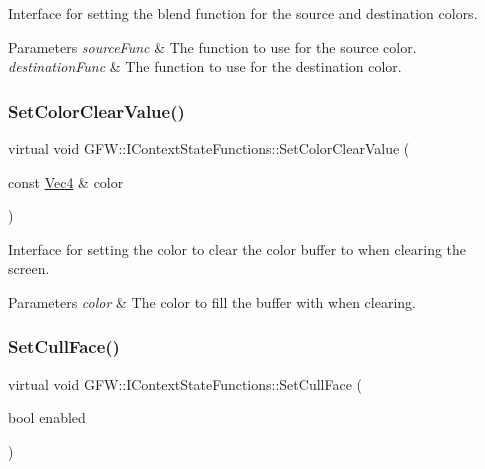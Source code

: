 Interface for setting the blend function for the source and destination colors. 


\begin{DoxyParams}{Parameters}
{\em source\+Func} & The function to use for the source color. \\
\hline
{\em destination\+Func} & The function to use for the destination color. \\
\hline
\end{DoxyParams}
\mbox{\label{class_g_f_w_1_1_i_context_state_functions_aa18c9eb29a5e2c85440e28e72db56b05}} 
\subsubsection{\texorpdfstring{Set\+Color\+Clear\+Value()}{SetColorClearValue()}}
{\footnotesize\ttfamily virtual void G\+F\+W\+::\+I\+Context\+State\+Functions\+::\+Set\+Color\+Clear\+Value (\begin{DoxyParamCaption}\item[{const \hyperlink{namespace_g_f_w_1_1_math_a22b76a9624ba36b0f4eaa46d2e6b1fae}{Vec4} \&}]{color }\end{DoxyParamCaption})\hspace{0.3cm}{\ttfamily [pure virtual]}}



Interface for setting the color to clear the color buffer to when clearing the screen. 


\begin{DoxyParams}{Parameters}
{\em color} & The color to fill the buffer with when clearing. \\
\hline
\end{DoxyParams}
\mbox{\label{class_g_f_w_1_1_i_context_state_functions_a88c4e68c29c47b63d2d07fd6176f7b07}} 
\subsubsection{\texorpdfstring{Set\+Cull\+Face()}{SetCullFace()}}
{\footnotesize\ttfamily virtual void G\+F\+W\+::\+I\+Context\+State\+Functions\+::\+Set\+Cull\+Face (\begin{DoxyParamCaption}\item[{bool}]{enabled }\end{DoxyParamCaption})\hspace{0.3cm}{\ttfamily [pure virtual]}}



